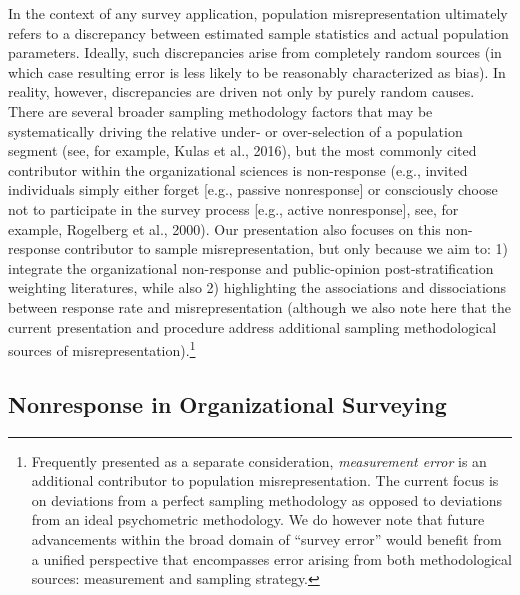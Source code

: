 \documentclass[
  man,mask]{apa7}
\begin{document}
In the context of any survey application, population misrepresentation ultimately refers to a discrepancy between estimated sample statistics and actual population parameters. Ideally, such discrepancies arise from completely random sources (in which case resulting error is less likely to be reasonably characterized as bias). In reality, however, discrepancies are driven not only by purely random causes. There are several broader sampling methodology factors that may be systematically driving the relative under- or over-selection of a population segment (see, for example, Kulas et al., 2016), but the most commonly cited contributor within the organizational sciences is non-response (e.g., invited individuals simply either forget {[}e.g., passive nonresponse{]} or consciously choose not to participate in the survey process {[}e.g., active nonresponse{]}, see, for example, Rogelberg et al., 2000). Our presentation also focuses on this non-response contributor to sample misrepresentation, but only because we aim to: 1) integrate the organizational non-response and public-opinion post-stratification weighting literatures, while also 2) highlighting the associations and dissociations between response rate and misrepresentation (although we also note here that the current presentation and procedure address additional sampling methodological sources of misrepresentation).\footnote{Frequently presented as a separate consideration, \emph{measurement error} is an additional contributor to population misrepresentation. The current focus is on deviations from a perfect sampling methodology as opposed to deviations from an ideal psychometric methodology. We do however note that future advancements within the broad domain of ``survey error'' would benefit from a unified perspective that encompasses error arising from both methodological sources: measurement and sampling strategy.}

\hypertarget{nonresponse-in-organizational-surveying}{%
\subsection{Nonresponse in Organizational Surveying}\label{nonresponse-in-organizational-surveying}}
\end{document}
